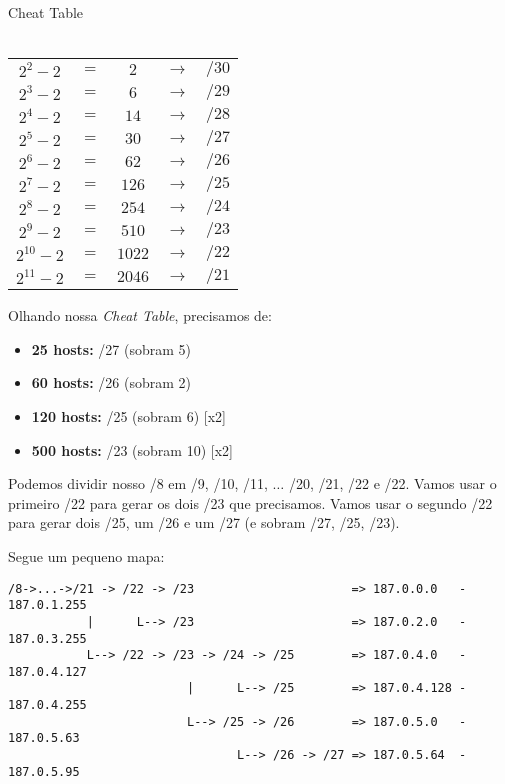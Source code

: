 \documentclass{article}
\begin{document}
\begin{table}[h]
    \centering
    \label{Cheat Table 11}
    {Cheat Table \\ \quad \\}
    \begin{tabular}{|ccccc|}
        \hline
        $ 2^{ 2} -2 $&$ = $&$    2 $&$ \rightarrow $&$ /30 $\\
        $ 2^{ 3} -2 $&$ = $&$    6 $&$ \rightarrow $&$ /29 $\\
        $ 2^{ 4} -2 $&$ = $&$   14 $&$ \rightarrow $&$ /28 $\\
        $ 2^{ 5} -2 $&$ = $&$   30 $&$ \rightarrow $&$ /27 $\\
        $ 2^{ 6} -2 $&$ = $&$   62 $&$ \rightarrow $&$ /26 $\\
        $ 2^{ 7} -2 $&$ = $&$  126 $&$ \rightarrow $&$ /25 $\\
        $ 2^{ 8} -2 $&$ = $&$  254 $&$ \rightarrow $&$ /24 $\\
        $ 2^{ 9} -2 $&$ = $&$  510 $&$ \rightarrow $&$ /23 $\\
        $ 2^{10} -2 $&$ = $&$ 1022 $&$ \rightarrow $&$ /22 $\\
        $ 2^{11} -2 $&$ = $&$ 2046 $&$ \rightarrow $&$ /21 $\\
        \hline
    \end{tabular}
\end{table}

Olhando nossa \textit{Cheat Table}, precisamos de:
\begin{itemize}
    \item \textbf{25 hosts:} /27 (sobram 5)
    \item \textbf{60 hosts:} /26 (sobram 2)
    \item \textbf{120 hosts:} /25 (sobram 6) [x2]
    \item \textbf{500 hosts:} /23 (sobram 10) [x2]
\end{itemize}

Podemos dividir nosso /8 em /9, /10, /11, \(\dots\) /20, /21, /22 e /22.
Vamos usar o primeiro /22 para gerar os dois /23 que precisamos.
Vamos usar o segundo /22 para gerar dois /25, um /26 e um /27
(e sobram /27, /25, /23).

Segue um pequeno mapa: \\
\begin{verbatim}
/8->...->/21 -> /22 -> /23                      => 187.0.0.0   - 187.0.1.255
           |      L--> /23                      => 187.0.2.0   - 187.0.3.255
           L--> /22 -> /23 -> /24 -> /25        => 187.0.4.0   - 187.0.4.127
                         |      L--> /25        => 187.0.4.128 - 187.0.4.255
                         L--> /25 -> /26        => 187.0.5.0   - 187.0.5.63
                                L--> /26 -> /27 => 187.0.5.64  - 187.0.5.95
\end{verbatim}
\end{document}
